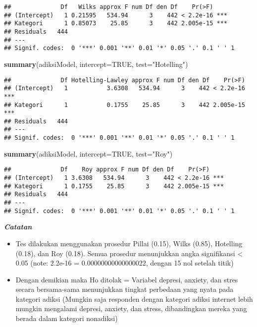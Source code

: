 \documentclass[
]{article}
\newenvironment{Shaded}{\begin{snugshade}}{\end{snugshade}}
\newcommand{\DataTypeTok}[1]{\textcolor[rgb]{0.13,0.29,0.53}{#1}}
\newcommand{\KeywordTok}[1]{\textcolor[rgb]{0.13,0.29,0.53}{\textbf{#1}}}
\newcommand{\NormalTok}[1]{#1}
\newcommand{\OtherTok}[1]{\textcolor[rgb]{0.56,0.35,0.01}{#1}}
\newcommand{\StringTok}[1]{\textcolor[rgb]{0.31,0.60,0.02}{#1}}
\begin{document}
\begin{verbatim}
##              Df   Wilks approx F num Df den Df    Pr(>F)    
## (Intercept)   1 0.21595   534.94      3    442 < 2.2e-16 ***
## Kategori      1 0.85073    25.85      3    442 2.005e-15 ***
## Residuals   444                                             
## ---
## Signif. codes:  0 '***' 0.001 '**' 0.01 '*' 0.05 '.' 0.1 ' ' 1
\end{verbatim}

\begin{Shaded}
\begin{Highlighting}[]
\KeywordTok{summary}\NormalTok{(adiksiModel, }\DataTypeTok{intercept=}\OtherTok{TRUE}\NormalTok{, }\DataTypeTok{test=}\StringTok{"Hotelling"}\NormalTok{)}
\end{Highlighting}
\end{Shaded}

\begin{verbatim}
##              Df Hotelling-Lawley approx F num Df den Df    Pr(>F)    
## (Intercept)   1           3.6308   534.94      3    442 < 2.2e-16 ***
## Kategori      1           0.1755    25.85      3    442 2.005e-15 ***
## Residuals   444                                                      
## ---
## Signif. codes:  0 '***' 0.001 '**' 0.01 '*' 0.05 '.' 0.1 ' ' 1
\end{verbatim}

\begin{Shaded}
\begin{Highlighting}[]
\KeywordTok{summary}\NormalTok{(adiksiModel, }\DataTypeTok{intercept=}\OtherTok{TRUE}\NormalTok{, }\DataTypeTok{test=}\StringTok{"Roy"}\NormalTok{)}
\end{Highlighting}
\end{Shaded}

\begin{verbatim}
##              Df    Roy approx F num Df den Df    Pr(>F)    
## (Intercept)   1 3.6308   534.94      3    442 < 2.2e-16 ***
## Kategori      1 0.1755    25.85      3    442 2.005e-15 ***
## Residuals   444                                            
## ---
## Signif. codes:  0 '***' 0.001 '**' 0.01 '*' 0.05 '.' 0.1 ' ' 1
\end{verbatim}

\textbf{\emph{Catatan}}

\begin{itemize}
\item
  Tes dilakukan menggunakan prosedur Pillai (0.15), Wilks (0.85),
  Hotelling (0.18), dan Roy (0.18). Semua prosedur menunjukkan angka
  signifikansi \textless{} 0.05 (note: 2.2e-16 = 0.00000000000000022,
  dengan 15 nol setelah titik)
\item
  Dengan demikian maka Ho ditolak = Variabel depresi, anxiety, dan stres
  secara bersama-sama menunjukkan tingkat perbedaan yang nyata pada
  kategori adiksi (Mungkin saja responden dengan kategori adiksi
  internet lebih mungkin mengalami depresi, anxiety, dan stress,
  dibandingkan mereka yang berada dalam kategori nonadiksi)
\end{itemize}
\end{document}
